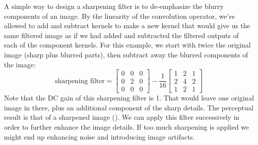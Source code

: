 

A simple way to design a sharpening filter is
to de-emphasize the blurry components of an image.  By the linearity
of the convolution operator, we're allowed to add and
subtract kernels to make a new kernel that would give us the same
filtered image as if we had added and subtracted the filtered outputs
of each of the component kernels.  For this example, we start with
twice the original image (sharp plus blurred parts), then subtract
away  the blurred components of the image: 
\begin{equation}
\text{sharpening filter} = 
\begin{bmatrix}
  0& 0 & 0 \\
  0 & 2 & 0\\
  0 &  0 & 0
\end{bmatrix}
-
\frac{1}{16}
\begin{bmatrix}
  1& 2 & 1 \\
  2 & 4 & 2\\
  1 &  2 & 1
\end{bmatrix}
\label{eq:sharpening}
\end{equation}
Note that the DC gain of this sharpening filter is 1. That would leave
one original image in there, plus an additional component of the sharp
details.  The perceptual result is that of a sharpened image (\fig{\ref{fig:convExamps3}}). We can apply this filter successively in order to further enhance the image details. If too much sharpening is applied we might end up enhancing noise and introducing image artifacts.


